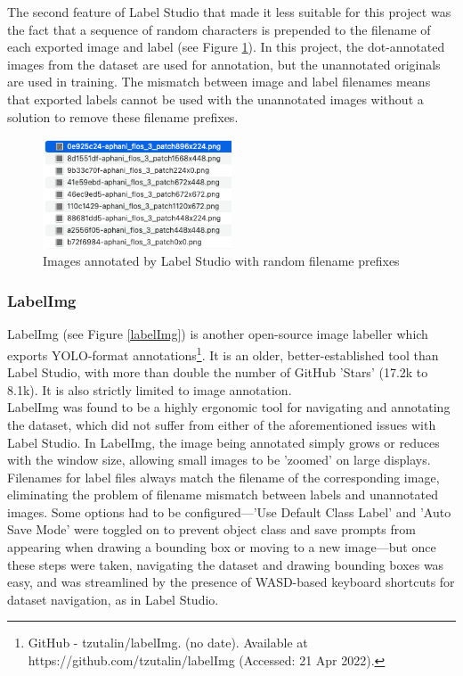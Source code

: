 The second feature of Label Studio that made it less suitable for this project was the fact that a sequence of random characters is prepended to the filename of each exported image and label (see Figure \ref{label-studio-prefix}). In this project, the dot-annotated images from the dataset are used for annotation, but the unannotated originals are used in training. The mismatch between image and label filenames means that exported labels cannot be used with the unannotated images without a solution to remove these filename prefixes.

\begin{figure}[h!]
	\centering
	\includegraphics[width=0.5\textwidth]{images/03Design/label-studio-prefix.png}
	\caption{Images annotated by Label Studio with random filename prefixes}
    \label{label-studio-prefix}
\end{figure}

\subsubsection{LabelImg}
LabelImg (see Figure \ref{labelImg}) is another open-source image labeller which exports YOLO-format annotations\footnote{GitHub - tzutalin/labelImg. (no date). Available at https://github.com/tzutalin/labelImg (Accessed: 21 Apr 2022).}. It is an older, better-established tool than Label Studio, with more than double the number of GitHub 'Stars' (17.2k to 8.1k). It is also strictly limited to image annotation.\\

LabelImg was found to be a highly ergonomic tool for navigating and annotating the dataset, which did not suffer from either of the aforementioned issues with Label Studio. In LabelImg, the image being annotated simply grows or reduces with the window size, allowing small images to be 'zoomed' on large displays. Filenames for label files always match the filename of the corresponding image, eliminating the problem of filename mismatch between labels and unannotated images. Some options had to be configured⁠—'Use Default Class Label' and 'Auto Save Mode' were toggled on to prevent object class and save prompts from appearing when drawing a bounding box or moving to a new image⁠⁠—but once these steps were taken, navigating the dataset and drawing bounding boxes was easy, and was streamlined by the presence of WASD-based keyboard shortcuts for dataset navigation, as in Label Studio.

